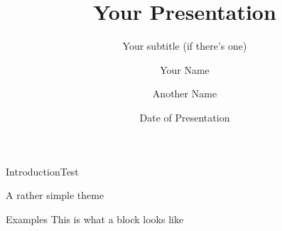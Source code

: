 \documentclass[
  10pt,
  aspectratio=169,
  xcolor={dvipsnames,table,x11names},  %
]{beamer}
\title[Your Short Title]{Your Presentation}
\subtitle{Your subtitle (if there's one)}
\author[\MakeUppercase{Your name (short)}]{Your Name \and Another Name}  %
\institute{Your Faculty/Department}
\date{Date of Presentation}
\begin{document}
{  %
\begin{frame}  %
  \vspace*{-2\baselineskip}%
  \titlepage
\end{frame}
}



\begin{frame}{Introduction}{Test}

A rather simple theme

\begin{block}{Examples}
This is what a block looks like
\end{block}

\end{frame}
\end{document}
